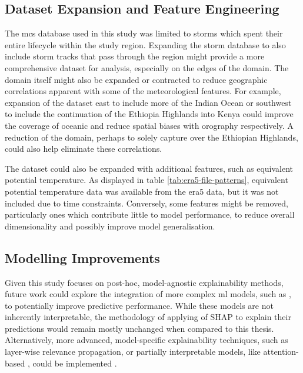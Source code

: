 \subsection{Dataset Expansion and Feature Engineering}

The \acrshort{mcs} database used in this study was limited to storms which spent their entire lifecycle within the study region. Expanding the storm database to also include storm tracks that pass through the region might provide a more comprehensive dataset for analysis, especially on the edges of the domain. The domain itself might also be expanded or contracted to reduce geographic correlations apparent with some of the meteorological features. For example, expansion of the dataset east to include more of the Indian Ocean or southwest to include the continuation of the Ethiopia Highlands into Kenya could improve the coverage of oceanic  and reduce spatial biases with orography respectively. A reduction of the domain, perhaps to solely capture  over the Ethiopian Highlands, could also help eliminate these correlations.

The dataset could also be expanded with additional features, such as equivalent potential temperature. As displayed in table \ref{tab:era5-file-patterns}, equivalent potential temperature data was available from the \acrshort{era5} data, but it was not included due to time constraints. Conversely, some features might be removed, particularly ones which contribute little to model performance, to reduce overall dimensionality and possibly improve model generalisation.

\subsection{Modelling Improvements}

Given this study focuses on post-hoc, model-agnostic explainability methods, future work could explore the integration of more complex \acrshort{ml} models, such as , to potentially improve predictive performance. While these models are not inherently interpretable, the methodology of applying of SHAP to explain their predictions would remain mostly unchanged when compared to this thesis. Alternatively, more advanced, model-specific explainability techniques, such as layer-wise relevance propagation, or partially interpretable models, like attention-based , could be implemented \citep{Zhuo2021,FurkanTekin2021}.
